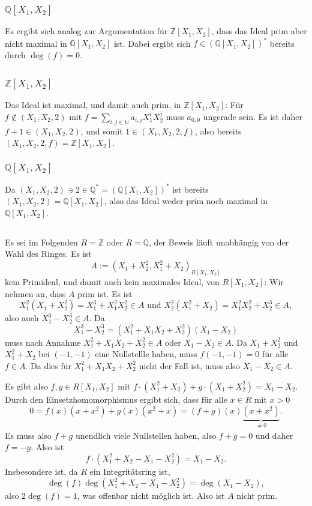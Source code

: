 \documentclass[a4paper,10pt]{article}
\theoremstyle{definition}
\newcommand{\N}{\mathbb{N}}
\newcommand{\Z}{\mathbb{Z}}
\newcommand{\Q}{\mathbb{Q}}
\begin{document}
\subsubsection{$\Q[X_1, X_2]$}
Es ergibt sich analog zur Argumentation für $\Z[X_1, X_2]$, dass das Ideal prim aber nicht maximal in $\Q[X_1, X_2]$ ist. Dabei ergibt sich $f \in (\Q[X_1, X_2])^*$ bereits durch $\deg(f) = 0$.


\subsection{}

\subsubsection{$\Z[X_1, X_2]$}
Das Ideal ist maximal, und damit auch prim, in $\Z[X_1, X_2]$: Für $f \not\in (X_1, X_2, 2)$ mit $f = \sum_{i,j \in \N} a_{i,j} X^i_1 X^j_2$ muss $a_{0,0}$ ungerade sein. Es ist daher $f+1 \in (X_1, X_2, 2)$, und somit $1 \in (X_1, X_2, 2, f)$, also bereits $(X_1, X_2, 2, f) = \Z[X_1, X_2]$.

\subsubsection{$\Q[X_1, X_2]$}
Da $(X_1, X_2, 2) \ni 2 \in \Q^* = (\Q[X_1, X_2])^*$ ist bereits $(X_1, X_2, 2) = \Q[X_1, X_2]$, also das Ideal weder prim noch maximal in $\Q[X_1, X_2]$.


\subsection{}
Es sei im Folgenden $R = \Z$ oder $R = \Q$, der Beweis läuft unabhängig von der Wahl des Ringes. Es ist
\[
 A := (X_1 + X_2^2, X_1^2 + X_2)_{R[X_1, X_2]}
\]
kein Primideal, und damit auch kein maximales Ideal, von $R[X_1, X_2]$: Wir nehmen an, dass $A$ prim ist. Es ist
\[
 X_1^2 (X_1 + X_2^2) = X_1^3 + X_1^2 X_2^2 \in A \text{ und }
 X_2^2 (X_1^2 + X_2) = X_1^2 X_2^2 + X_2^3 \in A,
\]
also auch $X_1^3 - X_2^3 \in A$. Da
\[
 X_1^3 - X_2^3 = (X_1^2 + X_1 X_2 + X_2^2)(X_1 - X_2)
\]
muss nach Annahme $X_1^2 + X_1 X_2 + X_2^2 \in A$ oder $X_1 - X_2 \in A$. Da $X_1+X_2^2$ und $X_1^2+X_2$ bei $(-1,-1)$ eine Nullstellle haben, muss $f(-1,-1) = 0$ für alle $f \in A$. Da dies für $X_1^2 + X_1 X_2 + X_2^2$ nicht der Fall ist, muss also $X_1 - X_2 \in A$.

Es gibt also $f,g \in R[X_1, X_2]$ mit $f \cdot (X_1^2+X_2) + g \cdot (X_1+X_2^2) = X_1 - X_2$. Durch den Einsetzhomomorphismus ergibt sich, dass für alle $x \in R$ mit $x > 0$
\[
 0 = f(x)(x+x^2)+g(x)(x^2+x) = (f+g)(x)\underbrace{(x+x^2)}_{\neq 0}.
\]
Es muss also $f+g$ unendlich viele Nullstellen haben, also $f+g=0$ und daher $f=-g$. Also ist
\[
 f\cdot (X_1^2 +X_2 -X_1- X_2^2) = X_1 - X_2.
\]
Insbesondere ist, da $R$ ein Integritätsring ist,
\[
 \deg(f) \deg(X_1^2 +X_2 -X_1- X_2^2) = \deg(X_1 - X_2),
\]
also $2 \deg(f) = 1$, was offenbar nicht möglich ist. Also ist $A$ nicht prim.
\end{document}
